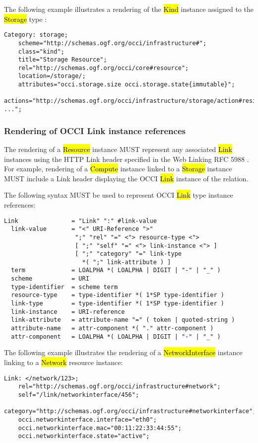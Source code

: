 \documentclass[10pt,a4paper]{article}
\begin{document}
The following example illustrates a rendering of the \hl{Kind}
instance assigned to the \hl{Storage} type \cite{occi:infrastructure}:

\begin{verbatim}
Category: storage;
    scheme="http://schemas.ogf.org/occi/infrastructure#";
    class="kind";
    title="Storage Resource";
    rel="http://schemas.ogf.org/occi/core#resource";
    location=/storage/;
    attributes="occi.storage.size occi.storage.state{immutable}";
    actions="http://schemas.ogf.org/occi/infrastructure/storage/action#resize ...";
\end{verbatim}

\subsubsection{Rendering of OCCI Link instance references}
The rendering of a \hl{Resource} instance \cite{occi:core} MUST
represent any associated \hl{Link} instances using the HTTP Link
header specified in the Web Linking RFC 5988 \cite{rfc5988}.  For
example, rendering of a \hl{Compute} instance linked to a \hl{Storage}
instance MUST include a Link header displaying the OCCI \hl{Link}
instance of the relation.

The following syntax MUST be used to represent OCCI \hl{Link} type
instance references:

\begin{verbatim}
Link               = "Link" ":" #link-value
  link-value       = "<" URI-Reference ">"
                    ";" "rel" "=" <"> resource-type <">
                    [ ";" "self" "=" <"> link-instance <"> ]
                    [ ";" "category" "=" link-type
                      *( ";" link-attribute ) ]
  term             = LOALPHA *( LOALPHA | DIGIT | "-" | "_" )
  scheme           = URI
  type-identifier  = scheme term
  resource-type    = type-identifier *( 1*SP type-identifier )
  link-type        = type-identifier *( 1*SP type-identifier )
  link-instance    = URI-reference
  link-attribute   = attribute-name "=" ( token | quoted-string )
  attribute-name   = attr-component *( "." attr-component )
  attr-component   = LOALPHA *( LOALPHA | DIGIT | "-" | "_" )
\end{verbatim}

The following example illustrates the rendering of a
\hl{NetworkInterface} \cite{occi:infrastructure} instance linking to a
\hl{Network} resource instance:

\begin{verbatim}
Link: </network/123>;
    rel="http://schemas.ogf.org/occi/infrastructure#network";
    self="/link/networkinterface/456";
    category="http://schemas.ogf.org/occi/infrastructure#networkinterface";
    occi.networkinterface.interface="eth0";
    occi.networkinterface.mac="00:11:22:33:44:55";
    occi.networkinterface.state="active";
\end{verbatim}
\end{document}
